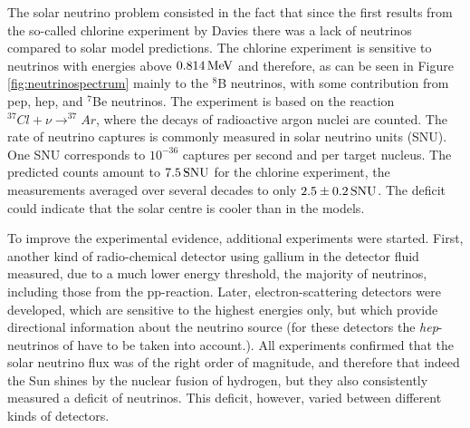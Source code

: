 \documentclass[a4paper,10pt]{article}
\begin{document}
{\noindent}The solar neutrino problem consisted in the fact that since the first results from the so-called chlorine experiment by Davies there was a lack of neutrinos compared to solar model predictions. The chlorine experiment is sensitive to neutrinos with energies above $0.814\,{\rm MeV}$ and therefore, as can be seen in Figure \ref{fig:neutrinospectrum} mainly to the $^8$B neutrinos, with some contribution from pep, hep, and $^7$Be neutrinos. The experiment is based on the reaction $^{37}Cl+\nu\rightarrow^{37}Ar$, where the decays of radioactive argon nuclei are counted. The rate of neutrino captures is commonly measured in solar neutrino units (SNU). One SNU corresponds to $10^{-36}$ captures per second and per target nucleus. The predicted counts amount to $7.5\,{\rm SNU}$ for the chlorine experiment, the measurements averaged over several decades to only $2.5\pm0.2\,{\rm SNU}$. The deficit could indicate that the solar centre is cooler than in the models.

{\noindent}To improve the experimental evidence, additional experiments were started. First, another kind of radio-chemical detector using gallium in the detector fluid measured, due to a much lower energy threshold, the majority of neutrinos, including those from the pp-reaction. Later, electron-scattering detectors were developed, which are sensitive to the highest energies only, but which provide directional information about the neutrino source (for these detectors the \textit{hep}-neutrinos of have to be taken into account.). All experiments confirmed that the solar neutrino flux was of the right order of magnitude, and therefore that indeed the Sun shines by the nuclear fusion of hydrogen, but they also consistently measured a deficit of neutrinos. This deficit, however, varied between different kinds of detectors.
\end{document}
